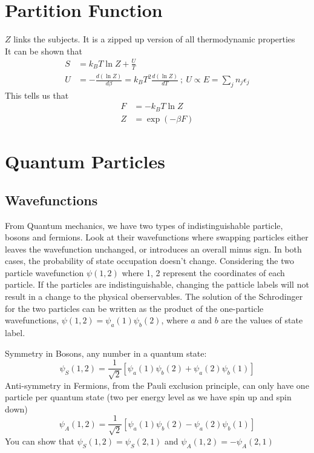 \documentclass[a4paper, 11pt, normalem]{report}
\begin{document}
\section{Partition Function}
$Z$ links the subjects. It is a zipped up version of all thermodynamic properties \\
It can be shown that
\begin{align*}
    S &= k_B T\ln Z + \frac{U}{T} \\
    U &= -\frac{d(\ln Z)}{d\beta} = k_B T^2 \frac{d(\ln Z)}{dT} ~;~ U \propto E = \sum_{j} n_j \epsilon_j
\end{align*}
This tells us that
\begin{align*}
    F &= -k_B T\ln Z \\
    Z &= \exp(-\beta F)
\end{align*}

\section{Quantum Particles}

\subsection{Wavefunctions}
From Quantum mechanics, we have two types of indistinguishable particle, bosons and fermions.
Look at their wavefunctions where swapping particles either leaves the wavefunction unchanged, or introduces an overall minus sign.
In both cases, the probability of state occupation doesn't change. Considering the two particle wavefunction $\psi(1,2)$ where 1, 2 represent the coordinates of each particle.
If the particles are indistinguishable, changing the patticle labels will not result in a change to the physical oberservables.
The solution of the Schrodinger for the two particles can be written as the product of the one-particle wavefunctions, $\psi(1,2) = \psi_{a}(1)\psi_{b}(2)$, where $a$ and $b$ are the values of state label.

Symmetry in Bosons, any number in a quantum state:
\begin{equation*}
    \psi_S (1,2) = \frac{1}{\sqrt{2}}[\psi_a(1)\psi_b(2) + \psi_a(2)\psi_b(1)]
\end{equation*}
Anti-symmetry in Fermions, from the Pauli exclusion principle, can only have one particle per quantum state (two per energy level as we have spin up and spin down)
\begin{equation*}
    \psi_A(1,2) = \frac{1}{\sqrt{2}}[\psi_a(1)\psi_b(2) - \psi_a(2)\psi_b(1)]
\end{equation*}
You can show that $\psi_S(1,2) = \psi_S(2,1)$ and $\psi_A(1,2) = -\psi_A(2,1)$
\end{document}
